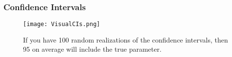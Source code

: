 \documentclass[11pt, xcolor=x11names,compress]{beamer}
\begin{document}
\begin{frame}[fragile,t]
\frametitle{Confidence Intervals}
\begin{figure}
    \centering
    \texttt{[image: VisualCIs.png]}
    \caption{If you have 100 random realizations of the confidence intervals, then 95 on average will include the true parameter.}
\end{figure}
 \end{frame}
\end{document}
